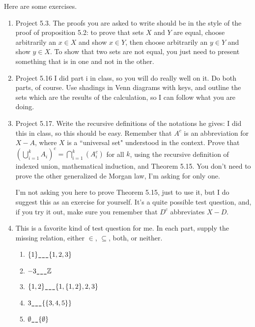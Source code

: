 \documentclass[12pt]{article}
\begin{document}
Here are some exercises.

\begin{enumerate}

\item Project 5.3.  The proofs you are asked to write should be in the style of the proof of proposition 5.2:  to prove that sets $X$ and $Y$ are equal, choose arbitrarily an $x \in X$ and show $x \in Y$, then choose arbitrarily an $y \in Y$ and show $y \in X$.  To show that two sets are not equal, you just need to present something that is in one and not in the other.

\item Project 5.16 I did part i in class, so you will do really well on it.  Do both parts, of course.   Use shadings in Venn diagrams with keys, and outline the sets which are the results of the calculation, so I can follow what you are doing.



\item Project 5.17.   Write the recursive definitions of the notations he gives:  I did this in class, so this should be easy.
Remember that $A^c$ is an abbreviation for $X-A$, where $X$ is a ``universal set" understood in the context.
Prove that $(\bigcup_{i=1}^k A_i)^c = \bigcap_{i=1}^k (A_i^c)$ for all $k$, using the recursive definition of indexed union,
mathematical induction, and Theorem 5.15.   You don't need to prove the other generalized de Morgan law, I'm asking for only one.

I'm not asking you here to prove Theorem 5.15, just to use it, but I do suggest this as an exercise for yourself.  It's a quite possible test question,
and, if you try it out, make sure you remember that $D^c$ abbreviates $X-D$.



\item This is a favorite kind of test question for me.  In each part, supply the missing relation, either $\in$, $\subseteq$, both, or neither.
\begin{enumerate}
\item  $\{1\} \verb|___| \{1,2,3\}$

\item  $-3 \verb|___| \mathbb Z$

\item  $\{1,2\} \verb|___| \{1,\{1,2\},2,3\}$

\item  $3 \verb|___| \{\{3,4,5\}\}$

\item $\emptyset \verb|__| \{\emptyset\}$
\end{enumerate}


\end{enumerate}
\end{document}

